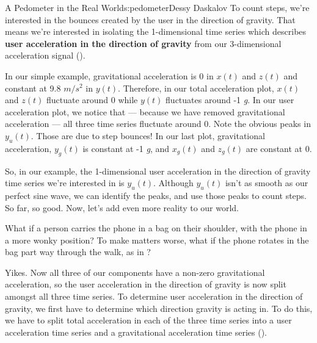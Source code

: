 \begin{aosachapter}{A Pedometer in the Real World}{s:pedometer}{Dessy Daskalov}
To count steps, we're interested in the bounces created by the user in
the direction of gravity. That means we're interested in isolating the
1-dimensional time series which describes \textbf{user acceleration in
the direction of gravity} from our 3-dimensional acceleration signal
().

In our simple example, gravitational acceleration is 0 in $x(t)$ and
$z(t)$ and constant at 9.8 $m/s^2$ in $y(t)$. Therefore, in our total
acceleration plot, $x(t)$ and $z(t)$ fluctuate around 0 while $y(t)$
fluctuates around -1 \emph{g}. In our user acceleration plot, we notice
that --- because we have removed gravitational acceleration --- all
three time series fluctuate around 0. Note the obvious peaks in
$y_{u}(t)$. Those are due to step bounces! In our last plot,
gravitational acceleration, $y_{g}(t)$ is constant at -1 \emph{g}, and
$x_{g}(t)$ and $z_{g}(t)$ are constant at 0.

So, in our example, the 1-dimensional user acceleration in the direction
of gravity time series we're interested in is $y_{u}(t)$. Although
$y_{u}(t)$ isn't as smooth as our perfect sine wave, we can identify the
peaks, and use those peaks to count steps. So far, so good. Now, let's
add even more reality to our world.

\label{people-are-complicated-creatures}

What if a person carries the phone in a bag on their shoulder, with the
phone in a more wonky position? To make matters worse, what if the phone
rotates in the bag part way through the walk, as in
?


Yikes. Now all three of our components have a non-zero gravitational
acceleration, so the user acceleration in the direction of gravity is
now split amongst all three time series. To determine user acceleration
in the direction of gravity, we first have to determine which direction
gravity is acting in. To do this, we have to split total acceleration in
each of the three time series into a user acceleration time series and a
gravitational acceleration time series
().



\end{aosachapter}
